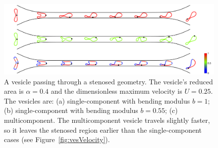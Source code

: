 \documentclass[twoside,twocolumn,9pt]{article}
\newcommand{\subfigimg}[3][,]{%
  \setbox1=\hbox{\texttt{[image: \#3]}}%
  \leavevmode\rlap{\usebox1}%
  \rlap{\hspace*{0pt}\raisebox{\dimexpr\ht1-0\baselineskip}{\bf
  \normalsize #2}}%
  \phantom{\usebox1}%
}
\begin{document}
\begin{figure}[t]
  \centering
  \includegraphics[width=0.9\linewidth]{figures/STENOSIS_RAp4MCp5.pdf}
  \caption{\label{fig:RA4} \small A vesicle passing through a stenosed
  geometry. The vesicle's reduced area is $\alpha = 0.4$ and the
  dimensionless maximum velocity is $U = 0.25$. The vesicles are: (a)
  single-component with bending modulus $b=1$; (b) single-component with
  bending modulus $b=0.55$; (c) multicomponent. The multicomponent
  vesicle travels slightly faster, so it leaves the stenosed region
  earlier than the single-component cases (see
  Figure~\ref{fig:vesVelocity}).}
\end{figure}


\end{document}
